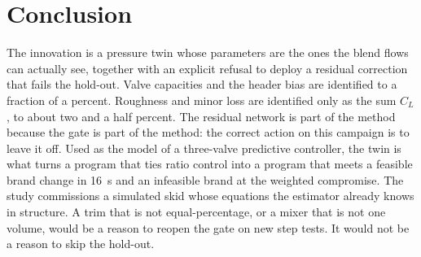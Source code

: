 \documentclass[11pt,a4paper]{article}
\begin{document}
\section{Conclusion}
The innovation is a pressure twin whose parameters are the ones the blend flows can actually see, together with an explicit refusal to deploy a residual correction that fails the hold-out. Valve capacities and the header bias are identified to a fraction of a percent. Roughness and minor loss are identified only as the sum $C_L$, to about two and a half percent. The residual network is part of the method because the gate is part of the method: the correct action on this campaign is to leave it off. Used as the model of a three-valve predictive controller, the twin is what turns a program that ties ratio control into a program that meets a feasible brand change in \SI{16}{\second} and an infeasible brand at the weighted compromise. The study commissions a simulated skid whose equations the estimator already knows in structure. A trim that is not equal-percentage, or a mixer that is not one volume, would be a reason to reopen the gate on new step tests. It would not be a reason to skip the hold-out.



\end{document}
